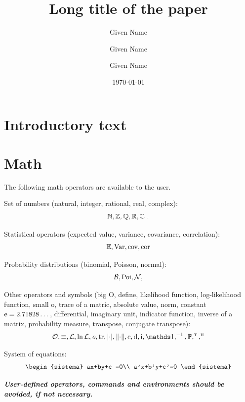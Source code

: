 \documentclass{statagroupwp}
\title{Long title of the paper}
\author{Given Name}{Family Name}{Department of xxx, University of xxx}
\author[*]{Given Name}{Family Name}{Department of xxx, University of xxx}
\author{Given Name}{Family Name}{Department of xxx, University of xxx}
\date{\today}
\begin{document}
\maketitle

\begin{abstract}
\lipsum[1]

\end{abstract}

\section{Introductory text}

\lipsum[1-2]

\section{Math}

The following math operators are available to the user.

Set of numbers (natural, integer, rational, real, complex):
\[
\operatorname{\mathbb{N}}, \operatorname{\mathbb{Z}}, \operatorname{\mathbb{Q}}, \operatorname{\mathbb{R}}, \operatorname{\mathbb{C}}\,.
\]

Statistical operators (expected value, variance, covariance, correlation):
\[
\operatorname{\mathbb{E}}, \operatorname{Var}, \operatorname{cov}, \operatorname{cor}
\]

Probability distributions (binomial, Poisson, normal):
\[
\operatorname{\mathcal{B}}, \operatorname{Poi}, \operatorname{\mathcal{N}},
\]

Other operators and symbols (big O, define, likelihood function, log-likelihood function, small o, trace of a matric, absolute value, norm, constant $\mathrm{e}=2.71828\dots$, differential, imaginary unit, indicator function, inverse of a matrix, probability measure, transpose, conjugate transpose):
\[
\bigO, \define, \Lik, \logLik, \smallo, \trace, \abs{\cdot}, \norma{\cdot},
\eu, \diff, \iu, \ind, \inv, \Pr, \T, \HH
\]

System of equations:
\[
\begin{sistema}
ax+by+c =0\\
a'x+b'y+c'=0
\end{sistema}
\]

\noindent\textbf{\em User-defined operators, commands and environments should be avoided, if not necessary.}
\end{document}
